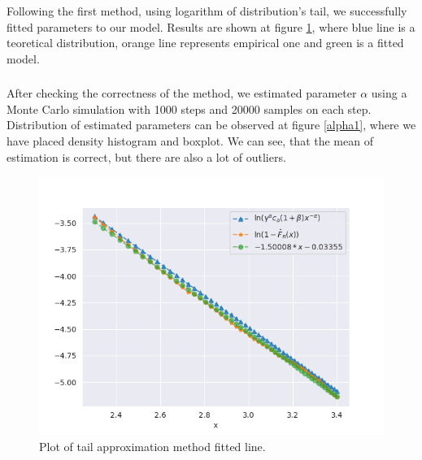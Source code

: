 \documentclass{article}
\begin{document}
		Following the first method, using logarithm of distribution's tail, we successfully fitted parameters to our model.
		Results are shown at figure \ref{tails1}, where blue line is a teoretical distribution, orange line represents empirical one and green is a fitted model.
		\subsubsection{}
        After checking the correctness of the method, we estimated parameter $\alpha$ using a Monte Carlo simulation with 1000 steps and 20000 samples on each step.
		Distribution of estimated parameters can be observed at figure \ref{alpha1}, where we have placed density histogram and boxplot.
		We can see, that the mean of estimation is correct, but there are also a lot of outliers.		 
		
		\begin{figure}[H]
			\centering
			\includegraphics[width=1\linewidth]{images/compare_cdf_plots_type_1.png}
			\caption{Plot of tail approximation method fitted line.}\label{tails1}
		\end{figure}
\end{document}
